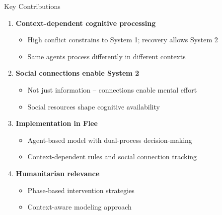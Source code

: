 \documentclass[aspectratio=169]{beamer}
\begin{document}
\begin{frame}{Key Contributions}

\begin{enumerate}
    \item \textbf{Context-dependent cognitive processing}
    \begin{itemize}
        \item High conflict constrains to System 1; recovery allows System 2
        \item Same agents process differently in different contexts
    \end{itemize}
    
    \item \textbf{Social connections enable System 2}
    \begin{itemize}
        \item Not just information – connections enable mental effort
        \item Social resources shape cognitive availability
    \end{itemize}
    
    \item \textbf{Implementation in Flee}
    \begin{itemize}
        \item Agent-based model with dual-process decision-making
        \item Context-dependent rules and social connection tracking
    \end{itemize}
    
    \item \textbf{Humanitarian relevance}
    \begin{itemize}
        \item Phase-based intervention strategies
        \item Context-aware modeling approach
    \end{itemize}
\end{enumerate}

\end{frame}
\end{document}
